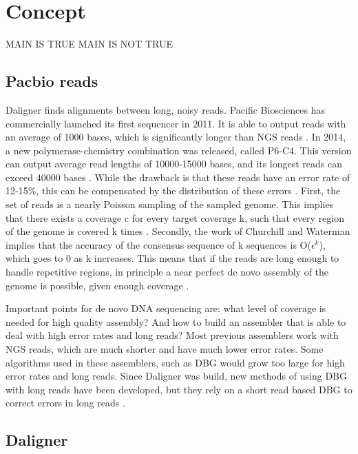 \documentclass[../main/thesis.tex]{subfiles}
\begin{document}
\chapter{Concept}
\ifdefined\main
\acresetall
MAIN IS TRUE
\newcommand{\code}{../3_concept/code/}
\else
MAIN IS NOT TRUE

\fi

\section{Pacbio reads}
Daligner finds alignments between long, noisy reads.
Pacific Biosciences has commercially launched its first sequencer in 2011.
It is able to output reads with an average of 1000 bases, which is significantly longer than \ac{NGS} reads \cite{PBlaunch1}.
In 2014, a new polymerase-chemistry combination was released, called P6-C4.
This version can output average read lengths of 10000-15000 bases, and its longest reads can exceed 40000 bases \cite{Longreads}.
While the drawback is that these reads have an error rate of 12-15\%, this can be compensated by the distribution of these errors \cite{Daligner}.
First, the set of reads is a nearly Poisson sampling of the sampled genome.
This implies that there exists a coverage c for every target coverage k, such that every region of the genome is covered k times \cite{Poisson}.
Secondly, the work of Churchill and Waterman \cite{quality} implies that the accuracy of the consensus sequence of k sequences is O($\epsilon^k$), which goes to 0 as k increases.
This means that if the reads are long enough to handle repetitive regions, in principle a near perfect de novo assembly of the genome is possible, given enough coverage \cite{Daligner}.

Important points for de novo DNA sequencing are: what level of coverage is needed for high quality assembly?
And how to build an assembler that is able to deal with high error rates and long reads?
Most previous assemblers work with \ac{NGS} reads, which are much shorter and have much lower error rates.
Some algorithms used in these assemblers, such as \ac{DBG} \cite{DeBruijn} would grow too large for high error rates and long reads.
Since Daligner was build, new methods of using \ac{DBG} with long reads have been developed, but they rely on a short read based \ac{DBG} to correct errors in long reads \cite{DBG1}\cite{DBG2}.

\section{Daligner}
\end{document}
